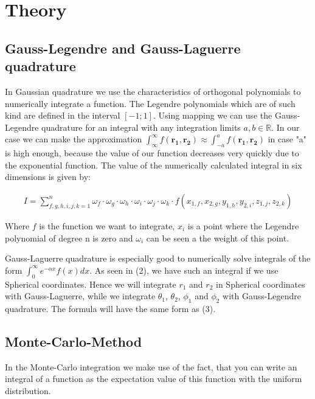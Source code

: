 \documentclass[10pt,a4paper]{article}
\begin{document}
\section{Theory}
\subsection{Gauss-Legendre and Gauss-Laguerre quadrature}

In Gaussian quadrature we use the characteristics of orthogonal polynomials to numerically integrate a function. The Legendre polynomials which are of such kind are defined in the interval $[-1;1]$. Using mapping we can use the Gauss-Legendre quadrature for an integral with any integration limits $a, b \in \mathbb{R}$. In our case we can make the approximation $\int_{\infty}^{\infty} f(\mathbf{r_1},\mathbf{r_2}) \approx \int_{-a}^{a} f(\mathbf{r_1},\mathbf{r_2})$ in case "a" is high enough, because the value of our function decreases very quickly due to the exponential function. The value of the numerically calculated integral in six dimensions is given by:

\begin{align}
	I = \sum_{f,g,h,i,j,k = 1}^{n}\omega_f \cdot \omega_g \cdot \omega_h \cdot \omega_i \cdot \omega_j \cdot \omega_k \cdot f(x_{1,f} , x_{2,g} , y_{1,h} , y_{2,i} , z_{1,j} , z_{2,k})  
\end{align}

Where $f$ is the function we want to integrate, $x_i$ is a point where the Legendre polynomial of degree n is zero and $\omega_i$ can be seen a the weight of this point.

Gauss-Laguerre quadrature is especially good to numerically solve integrals of the form $\int_{0}^{\infty} e^{-\alpha x} f(x) dx$. As seen in (2), we have such an integral if we use Spherical coordinates. Hence we will integrate $r_1$ and $r_2$ in Spherical coordinates with Gauss-Laguerre, while we integrate $\theta_1$, $\theta_2$, $\phi_1$ and $\phi_2$ with Gauss-Legendre quadrature. The formula will have the same form as (3).

\subsection{Monte-Carlo-Method} 

In the Monte-Carlo integration we make use of the fact, that you can write an integral of a function as the expectation value of this function with the uniform distribution.
\end{document}
